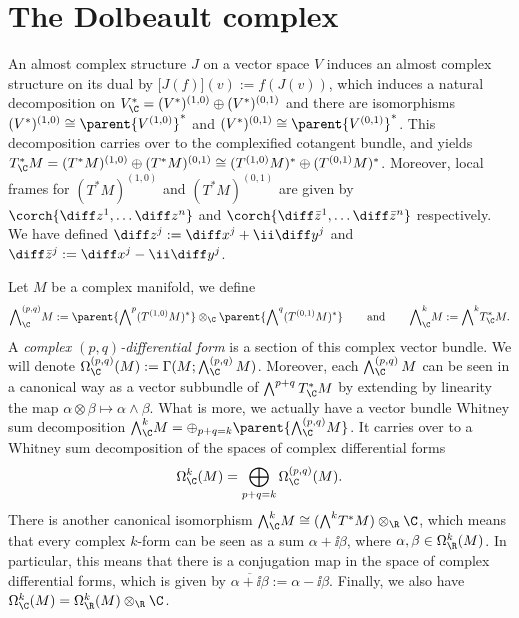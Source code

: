 \section{The Dolbeault complex} \label{sec_Dolbeault_complex}
An almost complex structure \(J\) on a vector space \(V\) induces an almost complex structure on its dual by \(\big[J(f)\big](v):=f(J(v))\), which induces a natural decomposition on \(V^*_\C=(V^*)^{(1,0)} \oplus (V^*)^{(0,1)}\) and there are isomorphisms \((V^*)^{(1,0)} \cong \parent{V^{(1,0)}}^*\) and \((V^*)^{(0,1)} \cong \parent{V^{(0,1)}}^*\). This decomposition carries over to the complexified cotangent bundle, and yields \(T_\C^*M =(T^*M)^{(1,0)} \oplus (T^*M)^{(0,1)} \cong (T^{(1,0)}M)^* \oplus (T^{(0,1)}M)^*\). Moreover, local frames for \((T^*M)^{(1,0)}\) and \((T^*M)^{(0,1)}\) are given by \(\corch{\diff z^1, \ldots \diff z^n}\) and \(\corch{\diff \bar{z}^1, \ldots \diff \bar{z}^n}\) respectively. We have defined \(\diff z^j:=\diff x^j + \ii \diff y^j\) and \(\diff \bar{z}^j:=\diff x^j -\ii \diff y^j\).

Let \(M\) be a complex manifold, we define 
\[
{\bigwedge}^{(p,q)}_\C M:=\parent{{\bigwedge}^p (T^{(1,0)}M)^*} \otimes_\C \parent{{\bigwedge}^q (T^{(0,1)} M)^*} \hspace{0.75 cm} \text{and} \hspace{0.75 cm} {\bigwedge}^k_\C M:={\bigwedge}^k T^*_\C M.
\]
A \textit{complex \((p,q)\)-differential form} is a section of this complex vector bundle. We will denote \(\Omega_\C^{(p,q)}(M):=\Gamma(M; \bigwedge^{(p,q)}_\C M)\). Moreover, each \(\bigwedge^{(p,q)}_\C M\) can be seen in a canonical way as a vector subbundle of \(\bigwedge^{p+q} T^*_\C M \) by extending by linearity the map \(\alpha \otimes \beta \mapsto \alpha \wedge \beta\). What is more, we actually have a vector bundle Whitney sum decomposition \({\bigwedge}^k_\C M= \oplus_{p+q=k} \parent{{\bigwedge}^{(p,q)}_\C M}\). It carries over to a Whitney sum decomposition of the spaces of complex differential forms 
\[
\Omega_\C^k(M)=\bigoplus_{p+q=k} \Omega_\C^{(p,q)}(M).
\]
There is another canonical isomorphism \({\bigwedge}^k_\C M \cong ({\bigwedge}^k T^*M) \otimes_\R \C\), which means that every complex \(k\)-form can be seen as a sum \(\alpha + \ii \beta\), where \(\alpha, \beta \in \Omega_\R^k(M)\). In particular, this means that there is a conjugation map in the space of complex differential forms, which is given by \(\overline{\alpha + \ii \beta}:=\alpha - \ii \beta\). Finally, we also have \(\Omega_\C^k(M)=\Omega_\R^k(M) \otimes _\R \C\). 

